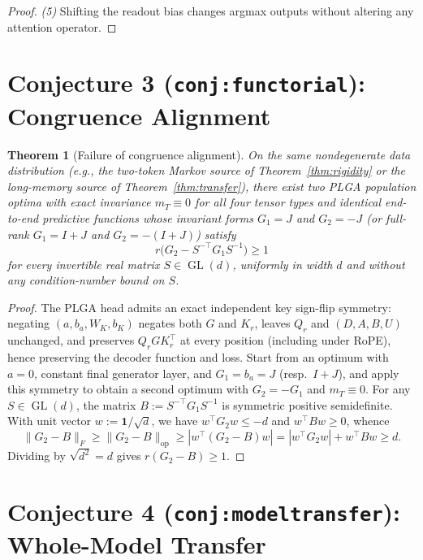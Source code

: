 \documentclass[11pt]{article}
\theoremstyle{plain}
\newtheorem{theorem}{Theorem}
\theoremstyle{definition}
\theoremstyle{remark}
\DeclareMathOperator{\GL}{GL}
\begin{document}
\begin{proof}
\emph{(5)} Shifting the readout bias changes argmax outputs without altering any attention operator.
\end{proof}

\section{Conjecture 3 (\texttt{conj:functorial}): Congruence Alignment}

\begin{theorem}[Failure of congruence alignment]\label{thm:congruence}
On the same nondegenerate data distribution (e.g., the two-token Markov source of Theorem~\ref{thm:rigidity} or the long-memory source of Theorem~\ref{thm:transfer}), there exist two PLGA population optima with exact invariance $m_T \equiv 0$ for all four tensor types and identical end-to-end predictive functions whose invariant forms $G_1 = J$ and $G_2 = -J$ (or full-rank $G_1 = I + J$ and $G_2 = -(I + J)$) satisfy
\[
r\bigl(G_2 - S^{-\top} G_1 S^{-1}\bigr) \ge 1
\]
for every invertible real matrix $S \in \GL(d)$, uniformly in width $d$ and without any condition-number bound on $S$.
\end{theorem}

\begin{proof}
The PLGA head admits an exact independent key sign-flip symmetry: negating $(a, b_a, W_K, b_K)$ negates both $G$ and $K_r$, leaves $Q_r$ and $(D, A, B, U)$ unchanged, and preserves $Q_r G K_r^\top$ at every position (including under RoPE), hence preserving the decoder function and loss. Start from an optimum with $a = 0$, constant final generator layer, and $G_1 = b_a = J$ (resp.\ $I + J$), and apply this symmetry to obtain a second optimum with $G_2 = -G_1$ and $m_T \equiv 0$.
For any $S \in \GL(d)$, the matrix $B := S^{-\top} G_1 S^{-1}$ is symmetric positive semidefinite. With unit vector $w := \mathbf{1}/\sqrt{d}$, we have $w^\top G_2 w \le -d$ and $w^\top B w \ge 0$, whence
\[
\|G_2 - B\|_F \ge \|G_2 - B\|_{\mathrm{op}} \ge |w^\top(G_2 - B)w| = |w^\top G_2 w| + w^\top B w \ge d.
\]
Dividing by $\sqrt{d^2} = d$ gives $r(G_2 - B) \ge 1$.
\end{proof}

\section{Conjecture 4 (\texttt{conj:modeltransfer}): Whole-Model Transfer}
\end{document}
